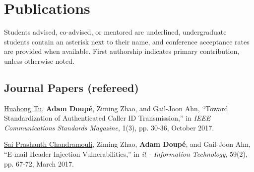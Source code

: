 \documentclass[11pt,letterpaper,sans]{moderncv}
\begin{document}







\section{Publications}

Students advised, co-advised, or mentored are underlined,
undergraduate students contain an asterisk next to their name, and
conference acceptance rates are provided when available. First
authorship indicates primary contribution, unless otherwise noted.

\subsection{Journal Papers (refereed)}

\begin{etaremune}

\item \underline{Huahong Tu}, \textbf{Adam Doup\'e}, Ziming Zhao, and
  Gail-Joon Ahn, ``Toward Standardization of Authenticated Caller ID
  Transmission,'' in \emph{IEEE Communications Standards Magazine},
    1(3), pp. 30-36, October 2017.

\item \underline{Sai Prashanth Chandramouli}, Ziming Zhao,
  \textbf{Adam Doup\'e}, and Gail-Joon Ahn, ``E-mail Header Injection
  Vulnerabilities,'' in \emph{it - Information Technology}, 59(2), pp.
  67-72, March 2017.

\end{etaremune}
\end{document}
